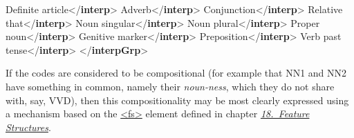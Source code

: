 \begin{shaded}
Definite article{</\textbf{interp}>}\mbox{}\newline 
{}Adverb{</\textbf{interp}>}\mbox{}\newline 
{}Conjunction{</\textbf{interp}>}\mbox{}\newline 
{}Relative that{</\textbf{interp}>}\mbox{}\newline 
{}Noun singular{</\textbf{interp}>}\mbox{}\newline 
{}Noun plural{</\textbf{interp}>}\mbox{}\newline 
{}Proper noun{</\textbf{interp}>}\mbox{}\newline 
{}Genitive marker{</\textbf{interp}>}\mbox{}\newline 
{}Preposition{</\textbf{interp}>}\mbox{}\newline 
{}Verb past tense{</\textbf{interp}>}\mbox{}\newline 
{</\textbf{interpGrp}>}\end{shaded}\egroup\par \noindent  If the codes are considered to be compositional (for example that NN1 and NN2 have something in common, namely their \textit{noun-ness}, which they do not share with, say, VVD), then this compositionality may be most clearly expressed using a mechanism based on the \hyperref[TEI.fs]{<fs>} element defined in chapter \textit{\hyperref[FS]{18.\ Feature Structures}}.\par
